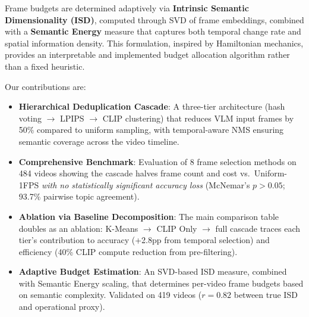 Frame budgets are determined adaptively via \textbf{Intrinsic Semantic Dimensionality (ISD)}, computed through SVD of frame embeddings, combined with a \textbf{Semantic Energy} measure that captures both temporal change rate and spatial information density. This formulation, inspired by Hamiltonian mechanics, provides an interpretable and implemented budget allocation algorithm rather than a fixed heuristic.

Our contributions are:
\begin{itemize}
    \item \textbf{Hierarchical Deduplication Cascade}: A three-tier architecture (hash voting $\rightarrow$ LPIPS $\rightarrow$ CLIP clustering) that reduces VLM input frames by 50\% compared to uniform sampling, with temporal-aware NMS ensuring semantic coverage across the video timeline.
    \item \textbf{Comprehensive Benchmark}: Evaluation of 8 frame selection methods on 484 videos showing the cascade halves frame count and cost vs.\ Uniform-1FPS \textit{with no statistically significant accuracy loss} (McNemar's $p > 0.05$; 93.7\% pairwise topic agreement).
    \item \textbf{Ablation via Baseline Decomposition}: The main comparison table doubles as an ablation: K-Means $\rightarrow$ CLIP Only $\rightarrow$ full cascade traces each tier's contribution to accuracy (+2.8pp from temporal selection) and efficiency (40\% CLIP compute reduction from pre-filtering).
    \item \textbf{Adaptive Budget Estimation}: An SVD-based ISD measure, combined with Semantic Energy scaling, that determines per-video frame budgets based on semantic complexity. Validated on 419 videos ($r = 0.82$ between true ISD and operational proxy).
\end{itemize}
